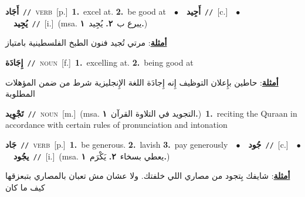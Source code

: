 \documentclass[10pt,a4paper,twoside]{article} %
\begin{document}
\begin{multicols}{2}
{\setlength\topsep{0pt}\textbf{\foreignlanguage{arabic}{أَجَاد}}\ {\color{gray}\texttt{//}\color{black}}\ \textsc{verb}\ [p.]\ \textbf{1.}~excel at.  \textbf{2.}~be good at\ \ $\bullet$\ \ \setlength\topsep{0pt}\textbf{\foreignlanguage{arabic}{أَجِيد}}\ {\color{gray}\texttt{//}\color{black}}\ [c.]\ \ $\bullet$\ \ \setlength\topsep{0pt}\textbf{\foreignlanguage{arabic}{يُجِيد}}\ {\color{gray}\texttt{//}\color{black}}\ [i.]\ \color{gray}(msa. \foreignlanguage{arabic}{يبرع ب}~\foreignlanguage{arabic}{\textbf{٢.}}  \foreignlanguage{arabic}{يُجِيد}~\foreignlanguage{arabic}{\textbf{١.}})\color{black}\  \begin{flushright}\color{gray}\foreignlanguage{arabic}{\textbf{\underline{\foreignlanguage{arabic}{أمثلة}}}: مرتي تُجيد فنون الطبخ الفلسطينية بامتياز}\end{flushright}\color{black}} \vspace{2mm}

{\setlength\topsep{0pt}\textbf{\foreignlanguage{arabic}{إِجَادَة}}\ {\color{gray}\texttt{//}\color{black}}\ \textsc{noun}\ [f.]\ \textbf{1.}~excelling at.  \textbf{2.}~being good at\  \begin{flushright}\color{gray}\foreignlanguage{arabic}{\textbf{\underline{\foreignlanguage{arabic}{أمثلة}}}: حاطين بإِعلان التوظيف إِنه إِجادَة اللغة الإِنجليزية شرط من ضمن المؤهلات المطلوبة}\end{flushright}\color{black}} \vspace{2mm}

{\setlength\topsep{0pt}\textbf{\foreignlanguage{arabic}{تَجْوِيد}}\ {\color{gray}\texttt{//}\color{black}}\ \textsc{noun}\ [m.]\ \color{gray}(msa. \foreignlanguage{arabic}{التجويد في التلاوة القرآن}~\foreignlanguage{arabic}{\textbf{١.}})\color{black}\ \textbf{1.}~reciting the Quraan in accordance with certain rules of pronunciation and intonation\ } \vspace{2mm}

{\setlength\topsep{0pt}\textbf{\foreignlanguage{arabic}{جَاد}}\ {\color{gray}\texttt{//}\color{black}}\ \textsc{verb}\ [p.]\ \textbf{1.}~be generous.  \textbf{2.}~lavish  \textbf{3.}~pay generously\ \ $\bullet$\ \ \setlength\topsep{0pt}\textbf{\foreignlanguage{arabic}{جُود}}\ {\color{gray}\texttt{//}\color{black}}\ [c.]\ \ $\bullet$\ \ \setlength\topsep{0pt}\textbf{\foreignlanguage{arabic}{يجُود}}\ {\color{gray}\texttt{//}\color{black}}\ [i.]\ \color{gray}(msa. \foreignlanguage{arabic}{يعطي بسخاء}~\foreignlanguage{arabic}{\textbf{٢.}}  \foreignlanguage{arabic}{يَكْرَم}~\foreignlanguage{arabic}{\textbf{١.}})\color{black}\  \begin{flushright}\color{gray}\foreignlanguage{arabic}{\textbf{\underline{\foreignlanguage{arabic}{أمثلة}}}: شايفك بِتجود من مصاري اللي خلفتك. ولا عشان مش تعبان بالمصاري بتبعزقها كيف ما كان}\end{flushright}\color{black}} \vspace{2mm}


\end{multicols}
\end{document}
